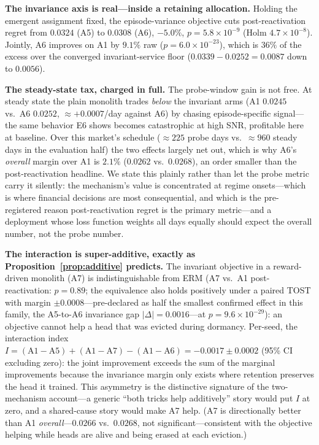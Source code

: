 \documentclass{article}
\begin{document}
\textbf{The invariance axis is real---inside a retaining allocation.}
Holding the emergent assignment fixed, the episode-variance objective cuts
post-reactivation regret from $0.0324$ (A5) to $0.0308$ (A6), $-5.0\%$,
$p = 5.8 \times 10^{-9}$ (Holm $4.7 \times 10^{-8}$). Jointly, A6 improves
on A1 by $9.1\%$ raw ($p = 6.0 \times 10^{-23}$), which is $36\%$ of the
excess over the converged invariant-service floor
($0.0339 - 0.0252 = 0.0087$ down to $0.0056$).

\textbf{The steady-state tax, charged in full.} The probe-window gain is
not free. At steady state the plain monolith trades \emph{below} the
invariant arms (A1 $0.0245$ vs.\ A6 $0.0252$, ${\approx}{+}0.0007$/day
against A6) by chasing episode-specific signal---the same behavior E6
shows becomes catastrophic at high SNR, profitable here at baseline.
Over this market's schedule (${\approx}225$ probe days vs.\
${\approx}960$ steady days in the evaluation half) the two effects
largely net out, which is why A6's \emph{overall} margin over A1 is
$2.1\%$ ($0.0262$ vs.\ $0.0268$), an order smaller than the
post-reactivation headline. We state this plainly rather than let the
probe metric carry it silently: the mechanism's value is concentrated
at regime onsets---which is where financial decisions are most
consequential, and which is the pre-registered reason post-reactivation
regret is the primary metric---and a deployment whose loss function
weights all days equally should expect the overall number, not the
probe number.

\textbf{The interaction is super-additive, exactly as
Proposition~\ref{prop:additive} predicts.} The invariant objective in a
reward-driven monolith (A7) is indistinguishable from ERM (A7 vs.\ A1
post-reactivation: $p = 0.89$; the equivalence also holds positively
under a paired TOST with margin $\pm 0.0008$---pre-declared as half the
smallest confirmed effect in this family, the A5-to-A6 invariance gap
$|\Delta| = 0.0016$---at $p = 9.6 \times 10^{-29}$): an objective cannot
help a head that was evicted during dormancy. Per-seed, the interaction index
$I = (\text{A1}{-}\text{A5}) + (\text{A1}{-}\text{A7}) -
(\text{A1}{-}\text{A6}) = -0.0017 \pm 0.0002$ (95\% CI excluding zero):
the joint improvement exceeds the sum of the marginal improvements because
the invariance margin only exists where retention preserves the head it
trained. This asymmetry is the distinctive signature of the two-mechanism
account---a generic ``both tricks help additively'' story would put $I$
at zero, and a shared-cause story would make A7 help. (A7 is directionally
better than A1 \emph{overall}---$0.0266$ vs.\ $0.0268$, not
significant---consistent with the objective helping while heads are alive
and being erased at each eviction.)
\end{document}
